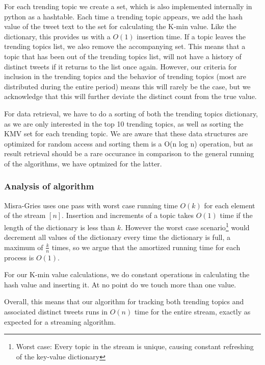 For each trending topic we create a set, which is also implemented internally in python as a hashtable. Each time a trending topic appears, we add the hash value of the tweet text to the set for calculating the K-min value. Like the dictionary, this provides us with a $O(1)$ insertion time. If a topic leaves the trending topics list, we also remove the accompanying set. This means that a topic that has been out of the trending topics list, will not have a history of distinct tweets if it returns to the list once again. However, our criteria for inclusion in the trending topics and the behavior of trending topics (most are distributed during the entire period) means this will rarely be the case, but we acknowledge that this will further deviate the distinct count from the true value.

For data retrieval, we have to do a sorting of both the trending topics dictionary, as we are only interested in the top 10 trending topics, as well as sorting the KMV set for each trending topic. We are aware that these data structures are optimized for random access and sorting them is a O(n log n) operation, but as result retrieval should be a rare occurance in comparison to the general running of the algorithms, we have optmized for the latter.

\subsubsection{Analysis of algorithm}
\label{algo-analysis}
Misra-Gries uses one pass with worst case running time $O(k)$ for each element of the stream $[n]$. Insertion and increments of a topic takes $O(1)$ time if the length of the dictionary is less than $k$. However the worst case scenario\footnote{Worst case: Every topic in the stream is unique, causing constant refreshing of the key-value dictionary} would decrement all values of the dictionary every time the dictionary is full, a maximum of $\frac{k}{n}$ times, so we argue that the amortized running time for each process is $O(1)$.

For our K-min value calculations, we do constant operations in calculating the hash value and inserting it. At no point do we touch more than one value.

Overall, this means that our algorithm for tracking both trending topics and associated distinct tweets runs in $O(n)$ time for the entire stream, exactly as expected for a streaming algorithm.

